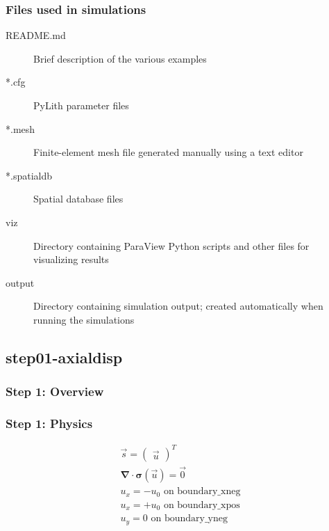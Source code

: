 \documentclass[aspectratio=169]{beamer}
\begin{document}
\begin{frame}
  \frametitle{Files used in simulations}

  \begin{description}
  \item[README.md] Brief description of the various examples
  \item[*.cfg] PyLith parameter files
  \item[*.mesh] Finite-element mesh file generated manually using a text editor
  \item[*.spatialdb] Spatial database files
  \item[viz] Directory containing ParaView Python scripts and other files for visualizing results
  \item[output] Directory containing simulation output; created automatically when running the simulations
  \end{description}

\end{frame}
  

\subsection{step01-axialdisp}

\begin{frame}
  \frametitle{Step 1: Overview}

      
\end{frame}


\begin{frame}
  \frametitle{Step 1: Physics}
  \summary{}

  \begin{minipage}{0.35\textwidth}
    {\scriptsize
    \begin{gather*}
      \vec{s} = \left(\begin{array}{c} \vec{u} \end{array}\right)^T \\
      \boldsymbol{\nabla} \cdot \boldsymbol{\sigma}(\vec{u}) = \vec{0} \\
      u_x = -u_0 \text{ on boundary\_xneg} \\
      u_x = +u_0 \text{ on boundary\_xpos} \\
      u_y = 0 \text{ on boundary\_yneg}
    \end{gather*}}
  \end{minipage}
  \hfill
  \begin{minipage}{0.55\textwidth}
  \end{minipage}
      
\end{frame}
\end{document}
